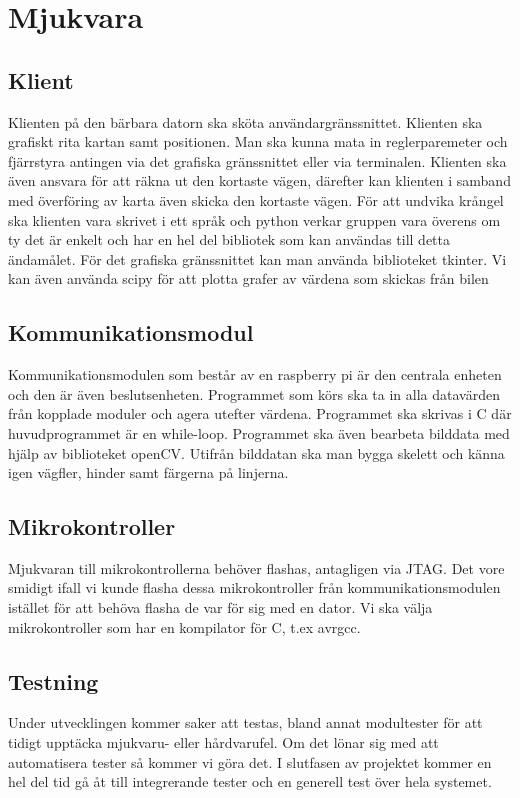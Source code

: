 \documentclass[systemskiss/skiss.tex]{subfiles}
\begin{document}
\section{Mjukvara}
\subsection{Klient}
Klienten på den bärbara datorn ska sköta användargränssnittet. Klienten ska
grafiskt rita kartan samt positionen. Man ska kunna mata in
reglerparemeter och fjärrstyra antingen via det grafiska gränssnittet eller via
terminalen. Klienten ska även ansvara för att räkna ut den kortaste vägen,
därefter kan klienten i samband med överföring av karta även skicka den
kortaste vägen. För att undvika krångel ska klienten vara skrivet i ett språk
och python verkar gruppen vara överens om ty det är enkelt och har en hel del
bibliotek som kan användas till detta ändamålet. För det grafiska gränssnittet
kan man använda biblioteket tkinter. Vi kan även använda scipy för att plotta
grafer av värdena som skickas från bilen

\subsection{Kommunikationsmodul}
Kommunikationsmodulen som består av en raspberry pi är den centrala enheten och
den är även beslutsenheten. Programmet som körs ska ta in alla datavärden från
kopplade moduler och agera utefter värdena. Programmet ska skrivas i C där
huvudprogrammet är en while-loop. Programmet ska även bearbeta bilddata med
hjälp av biblioteket openCV. Utifrån bilddatan ska man bygga skelett och känna
igen vägfler, hinder samt färgerna på linjerna.  


\subsection{Mikrokontroller}
Mjukvaran till mikrokontrollerna behöver flashas, antagligen via JTAG. Det vore
smidigt ifall vi kunde flasha dessa mikrokontroller från kommunikationsmodulen
istället för att behöva flasha de var för sig med en dator. Vi ska välja
mikrokontroller som har en kompilator för C, t.ex avrgcc. 

\subsection{Testning}
Under utvecklingen kommer saker att testas, bland annat modultester för att
tidigt upptäcka mjukvaru- eller hårdvarufel. Om det lönar sig med att
automatisera tester så kommer vi göra det. I slutfasen av projektet kommer en
hel del tid gå åt till integrerande tester och en generell test över hela
systemet.
\end{document}
